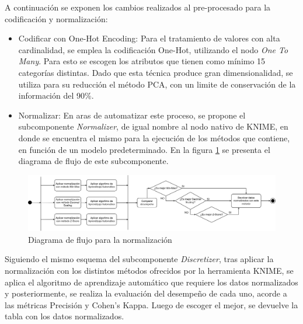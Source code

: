 A continuación se exponen los cambios realizados al pre-procesado para la codificación y normalización:

\begin{itemize}
	\item Codificar con One-Hot Encoding: Para el tratamiento de valores con alta cardinalidad, se emplea la codificación One-Hot, utilizando el nodo \textit{One To Many}. Para esto se escogen los atributos que tienen como mínimo 15 categorías distintas. Dado que esta técnica produce gran dimensionalidad, se utiliza para su reducción el método PCA, con un limite de conservación de la información del 90\%.
	\item Normalizar: En aras de automatizar este proceso, se propone el subcomponente \textit{Normalizer}, de igual nombre al nodo nativo de KNIME, en donde se encuentra el mismo para la ejecución de los métodos que contiene, en función de un modelo predeterminado. En la figura \ref{fig:normalizacion} se presenta el diagrama de flujo de este subcomponente. 
\end{itemize}


\begin{figure}[H]
	\centering
	\includegraphics[width=1\linewidth]{"figuras/capi 2/preprocesado/normalizacion.drawio"}
	\caption{Diagrama de flujo para la normalización}
	\label{fig:normalizacion}
\end{figure}

Siguiendo el mismo esquema del subcomponente \textit{Discretizer}, tras aplicar la normalización con los distintos métodos ofrecidos por la herramienta KNIME, se aplica el algoritmo de aprendizaje automático que requiere los datos normalizados y posteriormente, se realiza la evaluación del desempeño de cada uno, acorde a las métricas Precisión y Cohen's Kappa. Luego de escoger el mejor, se devuelve la tabla con los datos normalizados.


